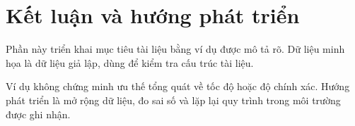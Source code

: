 \chapter{Kết luận và hướng phát triển}


\label{sec:chapter5}
Phần này triển khai mục tiêu tài liệu bằng ví dụ được mô tả rõ. Dữ liệu minh họa là dữ liệu giả lập, dùng để kiểm tra cấu trúc tài liệu.

Ví dụ không chứng minh ưu thế tổng quát về tốc độ hoặc độ chính xác. Hướng phát triển là mở rộng dữ liệu, đo sai số và lặp lại quy trình trong môi trường được ghi nhận.
